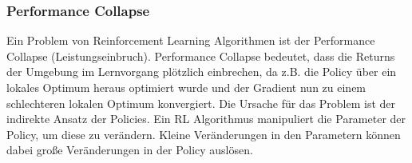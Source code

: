 \subsubsection{Performance Collapse}
Ein Problem von Reinforcement Learning Algorithmen ist der Performance Collapse (Leistungseinbruch). Performance Collapse bedeutet, dass die Returns der Umgebung im Lernvorgang plötzlich einbrechen, da z.B. die Policy über ein lokales Optimum heraus optimiert wurde und der Gradient nun zu einem schlechteren lokalen Optimum konvergiert. Die Ursache für das Problem ist der indirekte Ansatz der Policies. Ein RL Algorithmus manipuliert die Parameter der Policy, um diese zu verändern. Kleine Veränderungen in den Parametern können dabei große Veränderungen in der Policy auslösen. \cite{FoundationsDeepRL}



